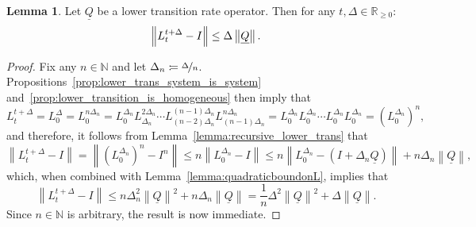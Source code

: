 \documentclass[10pt,a4paper]{paper}
\theoremstyle{definition}
\newtheorem{lemma}[theorem]{Lemma}
\newcommand{\nats}{\mathbb{N}}
\newcommand{\reals}{\mathbb{R}}
\newcommand{\realsnonneg}{\reals_{\geq 0}}
\newcommand{\lrate}{\underline{Q}}
\newcommand{\norm}[1]{\left\lVert #1 \right\rVert}
\newcommand{\coloneqq}{:\!=}
\begin{document}
\begin{lemma}\label{lemma:linearboundonL}
Let $\lrate$ be a lower transition rate operator. Then for any $t,\Delta\in\realsnonneg$:
\begin{equation*}
\norm{L_t^{t+\Delta}-I}\leq\Delta\norm{\lrate}.\vspace{5pt}
\end{equation*}
\end{lemma}
\begin{proof}
Fix any $n\in\nats$ and let $\Delta_n\coloneqq\nicefrac{\Delta}{n}$. Propositions~\ref{prop:lower_trans_system_is_system} and~\ref{prop:lower_transition_is_homogeneous} then imply that
\begin{equation*}
L_t^{t+\Delta}
=L_0^{\Delta}
=L_0^{n\Delta_n}
=L_0^{\Delta_n}
L_{\Delta_n}^{2\Delta_n}
\cdots
L_{(n-2)\Delta_n}^{(n-1)\Delta_n}
L_{(n-1)\Delta_n}^{n\Delta_n}
=L_0^{\Delta_n}
L_0^{\Delta_n}
\cdots
L_0^{\Delta_n}
L_0^{\Delta_n}
=(L_0^{\Delta_n})^n,
\end{equation*}
and therefore, it follows from Lemma~\ref{lemma:recursive_lower_trans} that
\begin{equation*}
\norm{L_t^{t+\Delta}-I}
=
\norm{(L_0^{\Delta_n})^n-I^n}
\leq n\norm{L_0^{\Delta_n}-I}
\leq n\norm{L_0^{\Delta_n}-(I+\Delta_n\lrate)}+n\Delta_n\norm{\lrate},
\end{equation*}
which, when combined with Lemma~\ref{lemma:quadraticboundonL}, implies that
\begin{equation*}
\norm{L_t^{t+\Delta}-I}
\leq
n\Delta_n^2\norm{\lrate}^2+n\Delta_n\norm{\lrate}
=\frac{1}{n}\Delta^2\norm{\lrate}^2+\Delta\norm{\lrate}.
\end{equation*}
Since $n\in\nats$ is arbitrary, the result is now immediate.
\end{proof}
\end{document}
